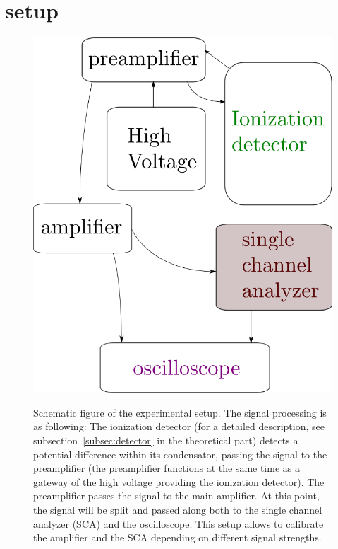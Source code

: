 \clearpage
\section{setup}
\label{sec:setup}

\begin{figure}
    \centering
    \caption{Schematic figure of the experimental setup. The
    signal processing is as following: The ionization detector
    (for a detailed description, see subsection~\ref{subsec:detector} 
    in the theoretical part) detects a potential difference within its
    condensator, passing the signal to the preamplifier (the preamplifier
    functions at the same time as a gateway of the high voltage providing
    the ionization detector). The preamplifier passes the signal to the
    main amplifier. At this point, the signal will be split and passed along
    both to the single channel analyzer (SCA) and the oscilloscope. This setup
    allows to calibrate the amplifier and the SCA depending on different
    signal strengths.
    }
    \includegraphics[width=0.5\linewidth]{figures/setup}
    \label{fig:setup1}
\end{figure}

